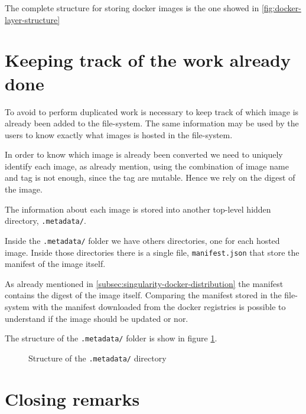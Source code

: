 The complete structure for storing docker images is the one showed in
\ref{fig:docker-layer-structure}

\section{Keeping track of the work already done}
\label{sec:methodology-keep-track}

To avoid to perform duplicated work is necessary to keep track of which image
is already been added to the file-system. The same information may be used by
the users to know exactly what images is hosted in the file-system.

In order to know which image is already been converted we need to uniquely
identify each image, as already mention, using the combination of image name
and tag is not enough, since the tag are mutable.  Hence we rely on the digest
of the image.

The information about each image is stored into another top-level hidden
directory, \texttt{.metadata/}.

Inside the \texttt{.metadata/} folder we have others directories, one for each
hosted image.  Inside those directories there is a single file,
\texttt{manifest.json} that store the manifest of the image itself.

As already mentioned in \ref{subsec:singularity-docker-distribution} the
manifest contains the digest of the image itself.  Comparing the manifest
stored in the file-system with the manifest downloaded from the docker
registries is possible to understand if the image should be updated or nor.

The structure of the \texttt{.metadata/} folder is show in figure
\ref{fig:metadata-folder-structure}.

\begin{figure}
\caption{Structure of the \texttt{.metadata/} directory}
\label{fig:metadata-folder-structure}
\end{figure}

\section{Closing remarks}

